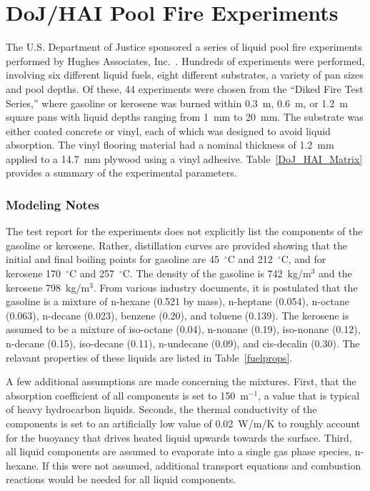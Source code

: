 \section{DoJ/HAI Pool Fire Experiments}
\label{DoJ_HAI_Pool_Fires_Description}

The U.S. Department of Justice sponsored a series of liquid pool fire experiments performed by Hughes Associates, Inc.~\cite{Mealy:DoJ_HAI_Pool_Fires}. Hundreds of experiments were performed, involving six different liquid fuels, eight different substrates, a variety of pan sizes and pool depths. Of these, 44 experiments were chosen from the ``Diked Fire Test Series,'' where gasoline or kerosene was burned within 0.3~m, 0.6~m, or 1.2~m square pans with liquid depths ranging from 1~mm to 20~mm. The substrate was either coated concrete or vinyl, each of which was designed to avoid liquid absorption. The vinyl flooring material had a nominal thickness of 1.2~mm applied to a 14.7~mm plywood using a vinyl adhesive. Table~\ref{DoJ_HAI_Matrix} provides a summary of the experimental parameters.

\subsubsection{Modeling Notes}

The test report for the experiments does not explicitly list the components of the gasoline or kerosene. Rather, distillation curves are provided showing that the initial and final boiling points for gasoline are 45~$^\circ$C and 212~$^\circ$C, and for kerosene 170~$^\circ$C and 257~$^\circ$C. The density of the gasoline is 742~kg/m$^3$ and the kerosene 798~kg/m$^3$. From various industry documents, it is postulated that the gasoline is a mixture of n-hexane (0.521 by mass), n-heptane (0.054), n-octane (0.063), n-decane (0.023), benzene (0.20), and toluene (0.139). The kerosene is assumed to be a mixture of iso-octane (0.04), n-nonane (0.19), iso-nonane (0.12), n-decane (0.15), iso-decane (0.11), n-undecane (0.09), and cis-decalin (0.30). The relavant properties of these liquids are listed in Table~\ref{fuelprops}.

A few additional assumptions are made concerning the mixtures. First, that the absorption coefficient of all components is set to 150~m$^{-1}$, a value that is typical of heavy hydrocarbon liquids. Seconds, the thermal conductivity of the components is set to an artificially low value of 0.02~W/m/K to roughly account for the buoyancy that drives heated liquid upwards towards the surface. Third, all liquid components are assumed to evaporate into a single gas phase species, n-hexane. If this were not assumed, additional transport equations and combustion reactions would be needed for all liquid components.

